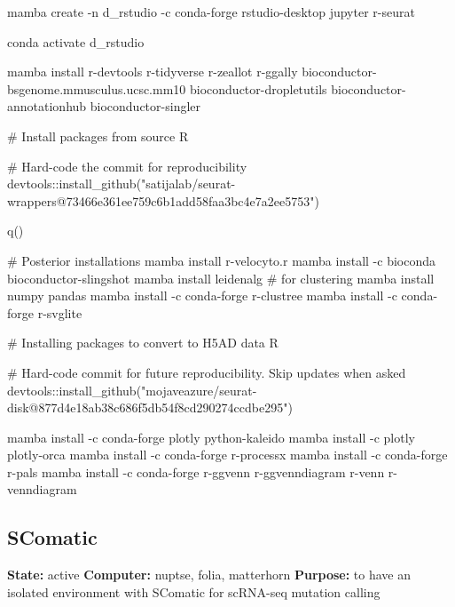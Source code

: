 \documentclass[
  letterpaper,
  DIV=11,
  numbers=noendperiod]{scrreprt}
\newenvironment{Shaded}{\begin{snugshade}}{\end{snugshade}}
\newcommand{\NormalTok}[1]{\textcolor[rgb]{0.00,0.23,0.31}{#1}}
\begin{document}
\begin{Shaded}
\begin{Highlighting}[]
\NormalTok{mamba create {-}n d\_rstudio {-}c conda{-}forge rstudio{-}desktop jupyter r{-}seurat}

\NormalTok{conda activate d\_rstudio}

\NormalTok{mamba install r{-}devtools r{-}tidyverse r{-}zeallot r{-}ggally bioconductor{-}bsgenome.mmusculus.ucsc.mm10 bioconductor{-}dropletutils bioconductor{-}annotationhub bioconductor{-}singler}

\NormalTok{\# Install packages from source}
\NormalTok{R}

\NormalTok{\# Hard{-}code the commit for reproducibility}
\NormalTok{devtools::install\_github("satijalab/seurat{-}wrappers@73466e361ee759c6b1add58faa3bc4e7a2ee5753")}

\NormalTok{q()}

\NormalTok{\# Posterior installations}
\NormalTok{mamba install r{-}velocyto.r}
\NormalTok{mamba install {-}c bioconda bioconductor{-}slingshot}
\NormalTok{mamba install leidenalg \# for clustering}
\NormalTok{mamba install numpy pandas}
\NormalTok{mamba install {-}c conda{-}forge r{-}clustree}
\NormalTok{mamba install {-}c conda{-}forge r{-}svglite}

\NormalTok{\# Installing packages to convert to H5AD data}
\NormalTok{R}

\NormalTok{\# Hard{-}code commit for future reproducibility. Skip updates when asked}
\NormalTok{devtools::install\_github("mojaveazure/seurat{-}disk@877d4e18ab38c686f5db54f8cd290274ccdbe295")}


\NormalTok{mamba install {-}c conda{-}forge plotly python{-}kaleido}
\NormalTok{mamba install {-}c plotly plotly{-}orca}
\NormalTok{mamba install {-}c conda{-}forge r{-}processx}
\NormalTok{mamba install {-}c conda{-}forge r{-}pals}
\NormalTok{mamba install {-}c conda{-}forge r{-}ggvenn r{-}ggvenndiagram r{-}venn r{-}venndiagram}
\end{Highlighting}
\end{Shaded}

\subsection{SComatic}\label{scomatic}

\textbf{State:} active \textbf{Computer:} nuptse, folia, matterhorn
\textbf{Purpose:} to have an isolated environment with SComatic for
scRNA-seq mutation calling
\end{document}
